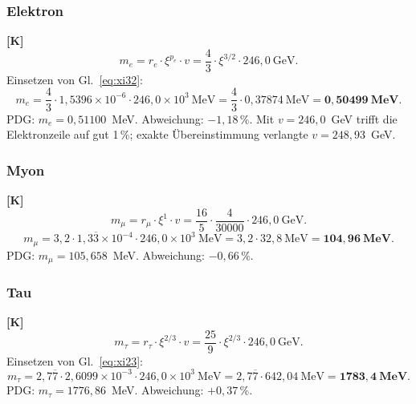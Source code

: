 \subsubsection{Elektron}

\textbf{[K]}
\begin{equation}
  m_e = r_e \cdot \xi^{p_e} \cdot v
      = \frac{4}{3} \cdot \xi^{3/2} \cdot 246{,}0~\text{GeV}.
\end{equation}
Einsetzen von Gl.~\eqref{eq:xi32}:
\begin{equation}
  m_e = \frac{4}{3} \cdot 1{,}5396 \times 10^{-6}
      \cdot 246{,}0 \times 10^3~\text{MeV}
      = \frac{4}{3} \cdot 0{,}37874~\text{MeV}
      = \mathbf{0{,}50499}~\mathbf{MeV}.
\end{equation}
PDG: $m_e = 0{,}51100$~MeV. Abweichung: $-1{,}18\,\%$.
Mit $v = 246{,}0$~GeV trifft die Elektronzeile auf gut 1\,\%; exakte
Übereinstimmung verlangte $v = 248{,}93$~GeV.

\subsubsection{Myon}

\textbf{[K]}
\begin{equation}
  m_\mu = r_\mu \cdot \xi^{1} \cdot v
        = \frac{16}{5} \cdot \frac{4}{30000} \cdot 246{,}0~\text{GeV}.
\end{equation}
\begin{equation}
  m_\mu = 3{,}2 \cdot 1{,}3\overline{3} \times 10^{-4}
        \cdot 246{,}0 \times 10^3~\text{MeV}
        = 3{,}2 \cdot 32{,}8~\text{MeV}
        = \mathbf{104{,}96}~\mathbf{MeV}.
\end{equation}
PDG: $m_\mu = 105{,}658$~MeV. Abweichung: $-0{,}66\,\%$.

\subsubsection{Tau}

\textbf{[K]}
\begin{equation}
  m_\tau = r_\tau \cdot \xi^{2/3} \cdot v
         = \frac{25}{9} \cdot \xi^{2/3} \cdot 246{,}0~\text{GeV}.
\end{equation}
Einsetzen von Gl.~\eqref{eq:xi23}:
\begin{equation}
  m_\tau = 2{,}7\overline{7} \cdot 2{,}6099 \times 10^{-3}
         \cdot 246{,}0 \times 10^3~\text{MeV}
         = 2{,}7\overline{7} \cdot 642{,}04~\text{MeV}
         = \mathbf{1783{,}4}~\mathbf{MeV}.
\end{equation}
PDG: $m_\tau = 1776{,}86$~MeV. Abweichung: $+0{,}37\,\%$.

